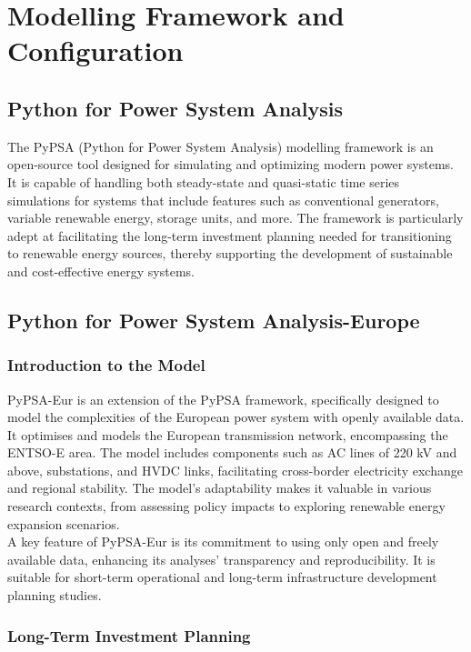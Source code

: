 \chapter{Modelling Framework and Configuration}

\section{Python for Power System Analysis}
The PyPSA (Python for Power System Analysis) modelling framework is an open-source tool designed for simulating and optimizing modern power systems. It is capable of handling both steady-state and quasi-static time series simulations for systems that include features such as conventional generators, variable renewable energy, storage units, and more. The framework is particularly adept at facilitating the long-term investment planning needed for transitioning to renewable energy sources, thereby supporting the development of sustainable and cost-effective energy systems.


\section{Python for Power System Analysis-Europe}

\subsection{Introduction to the Model}

PyPSA-Eur is an extension of the PyPSA framework, specifically designed to model the complexities of the European power system with openly available data. It optimises and models the European transmission network, encompassing the ENTSO-E area. The model includes components such as AC lines of 220 kV and above, substations, and HVDC links, facilitating cross-border electricity exchange and regional stability. The model's adaptability makes it valuable in various research contexts, from assessing policy impacts to exploring renewable energy expansion scenarios. \\

A key feature of PyPSA-Eur is its commitment to using only open and freely available data, enhancing its analyses' transparency and reproducibility. It is suitable for short-term operational and long-term infrastructure development planning studies.

\subsection{Long-Term Investment Planning}

